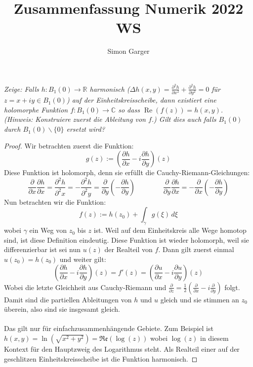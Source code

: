 \documentclass[11pt]{article}
\title{Zusammenfassung Numerik 2022 WS}
\author{Simon Garger}
\renewcommand{\Re}{\mathfrak{Re}}
\newenvironment{problem}[2][Beispiel]{
    \begin{trivlist}
        \item[\hskip \labelsep {\bfseries #1}\hskip \labelsep {\bfseries #2.}] \itshape}{
    \end{trivlist}\normalshape
}
\begin{document}
    \begin{problem}{1}
        Zeige: Falls $h: B_1(0) \rightarrow \mathbb{R}$ harmonisch ($\Delta h(x, y)=\frac{\partial^2 h}{\partial x^2}
        +\frac{\partial^2 h}{\partial y^2}=0$ für $z=x+i y \in B_1(0)$) auf der Einheitskreisscheibe,
        dann existiert eine holomorphe Funktion $f: B_1(0) \rightarrow \mathbb{C}$ so dass
        $\operatorname{Re}(f(z))=h(x, y)$.
        (Hinweis: Konstruiere zuerst die Ableitung von $f$.)
        Gilt dies auch falls $B_1(0)$ durch $B_1(0) \backslash\{0\}$ ersetzt wird?
    \end{problem}

    \begin{proof}
        Wir betrachten zuerst die Funktion:
        $$g(z):= \left(\frac{\partial h}{\partial x} - i\frac{\partial h}{\partial y}\right)(z)$$
        Diese Funktion ist holomorph, denn sie erfüllt die Cauchy-Riemann-Gleichungen:
        $$\frac{\partial }{\partial x}\frac{\partial h}{\partial x}=\frac{\partial^2 h}{\partial^2 x}
        =-\frac{\partial^2 h}{\partial^2 y}=\frac{\partial}{\partial y}\left(-\frac{\partial h}{\partial y}
        \right)\qquad\qquad \frac{\partial }{\partial y}\frac{\partial h}{\partial x} =
        -\frac{\partial }{\partial x}\left(-\frac{\partial h}{\partial y}\right)$$
        Nun betrachten wir die Funktion:
        $$f(z) := h(z_0) + \int_\gamma g(\xi)\,d\xi$$
        wobei $\gamma$ ein Weg von $z_0$ bis $z$ ist. Weil auf dem Einheitskreis alle Wege
        homotop sind, ist diese Definition eindeutig.  Diese Funktion ist wieder holomorph, weil sie differenzierbar ist
        sei nun $u(z)$ der Realteil von $f$. Dann gilt zuerst einmal $u(z_0)=h(z_0)$ und weiter gilt:
        $$\left(\frac{\partial h}{\partial x} - i\frac{\partial h}{\partial y}\right)(z)=f'(z) =
        \left(\frac{\partial u}{\partial x}-i\frac{\partial u}{\partial y}\right)(z)$$
        Wobei die letzte Gleichheit aus Cauchy-Riemann und $\frac{\partial}{\partial z}=\frac{1}{2}\left(
        \frac{\partial}{\partial x}-i\frac{\partial}{\partial y}\right)$ folgt.\\
        Damit sind die partiellen Ableitungen von $h$ und $u$ gleich und sie stimmen an $z_0$ überein, also sind sie
        insgesamt gleich.
        \\\\
        Das gilt nur für einfachzusammenhängende Gebiete. Zum Beispiel ist $h(x,y)=\ln(\sqrt{x^2+y^2})
        =\Re(\log(z))$ wobei $\log(z)$ in diesem Kontext für den Hauptzweig des Logarithmus steht.
        Als Realteil einer auf der geschlitzen Einheitskreisscheibe ist die Funktion harmonisch.

\end{proof}
\end{document}

